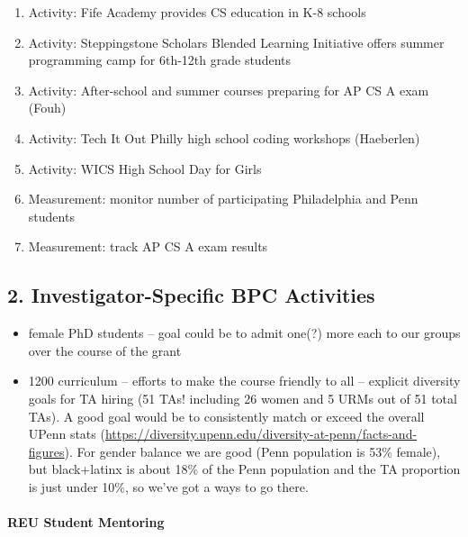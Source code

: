 \begin{enumerate}
\item Activity: Fife Academy provides CS education in K-8 schools
\item Activity: Steppingstone Scholars Blended Learning Initiative offers summer programming camp for 6th-12th grade students
\item Activity: After-school and summer courses preparing for AP CS A exam (Fouh)
\item Activity: Tech It Out Philly high school coding workshops (Haeberlen)
\item Activity: WICS High School Day for Girls
\item Measurement: monitor number of participating Philadelphia and Penn students
\item Measurement: track AP CS A exam results
\end{enumerate}

\subsection*{2. Investigator-Specific BPC Activities}

\begin{itemize}
\item female PhD students -- goal could be to admit one(?) more each to
our groups over the course of the grant
\item 1200 curriculum -- efforts to make the course friendly to all --
explicit diversity goals for TA hiring (51 TAs! including 26 women and
5 URMs out of 51 total TAs).  A good goal would be to consistently
match or exceed the overall UPenn stats
(\url{https://diversity.upenn.edu/diversity-at-penn/facts-and-figures}).
For gender balance we are good (Penn population is 53\% female), but
black+latinx is about 18\% of the Penn population and the TA
proportion is just under 10\%, so we've got a ways
to go there.
\end{itemize}

\setcounter{footnote}{0}

\paragraph*{REU Student Mentoring}

